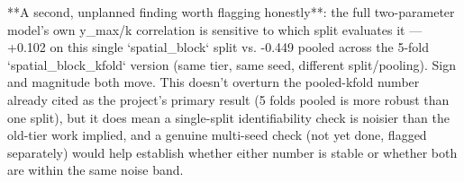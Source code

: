 **A second, unplanned finding worth flagging honestly**: the full two-parameter model's own
y_max/k correlation is sensitive to which split evaluates it — +0.102 on this single `spatial_block`
split vs. -0.449 pooled across the 5-fold `spatial_block_kfold` version (same tier, same seed,
different split/pooling). Sign and magnitude both move. This doesn't overturn the pooled-kfold
number already cited as the project's primary result (5 folds pooled is more robust than one
split), but it does mean a single-split identifiability check is noisier than the old-tier work
implied, and a genuine multi-seed check (not yet done, flagged separately) would help establish
whether either number is stable or whether both are within the same noise band.
